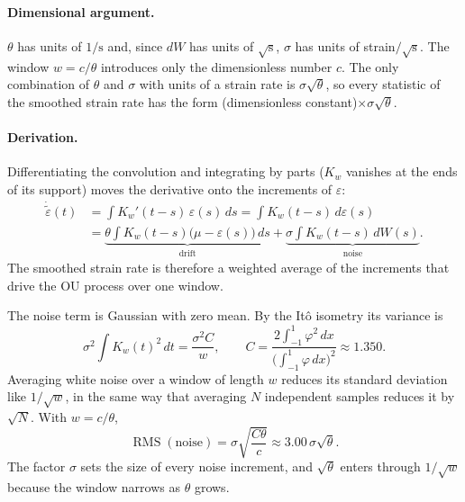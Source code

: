 \documentclass[11pt]{article}
\begin{document}
\paragraph{Dimensional argument.}
$\theta$ has units of $1/\mathrm{s}$ and, since $dW$ has units of
$\sqrt{\mathrm{s}}$, $\sigma$ has units of strain$/\sqrt{\mathrm{s}}$. The
window $w=c/\theta$ introduces only the dimensionless number $c$. The only
combination of $\theta$ and $\sigma$ with units of a strain rate is
$\sigma\sqrt{\theta}$, so every statistic of the smoothed strain rate has the
form (dimensionless constant)$\times\sigma\sqrt{\theta}$.

\paragraph{Derivation.}
Differentiating the convolution and integrating by parts ($K_w$ vanishes at
the ends of its support) moves the derivative onto the increments of
$\varepsilon$:
\begin{align}
    \dot{\tilde\varepsilon}(t)
     & = \int K_w'(t-s)\,\varepsilon(s)\,ds
    = \int K_w(t-s)\,d\varepsilon(s) \nonumber                                             \\
     & = \underbrace{\theta\int K_w(t-s)\bigl(\mu-\varepsilon(s)\bigr)\,ds}_{\text{drift}}
    + \underbrace{\sigma\int K_w(t-s)\,dW(s)}_{\text{noise}} .
\end{align}
The smoothed strain rate is therefore a weighted average of the increments
that drive the OU process over one window.

The noise term is Gaussian with zero mean. By the It\^o isometry its
variance is
\begin{equation}
    \sigma^2\int K_w(t)^2\,dt = \frac{\sigma^2 C}{w},
    \qquad
    C = \frac{2\int_{-1}^{1}\varphi^2\,dx}{\bigl(\int_{-1}^{1}\varphi\,dx\bigr)^2}\approx 1.350 .
\end{equation}
Averaging white noise over a window of length $w$ reduces its standard
deviation like $1/\sqrt{w}$, in the same way that averaging $N$ independent
samples reduces it by $\sqrt{N}$. With $w=c/\theta$,
\begin{equation}
    \operatorname{RMS}(\text{noise})
    = \sigma\sqrt{\frac{C\theta}{c}}
    \approx 3.00\,\sigma\sqrt{\theta}.
\end{equation}
The factor $\sigma$ sets the size of every noise increment, and
$\sqrt{\theta}$ enters through $1/\sqrt{w}$ because the window narrows as
$\theta$ grows.
\end{document}
